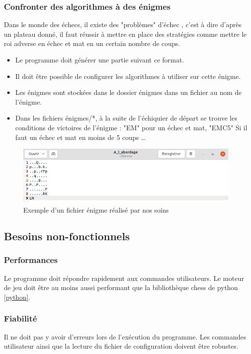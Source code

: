 \huge\documentclass{article}
\begin{document}
\subsubsection{Confronter des algorithmes à des énigmes}
Dans le monde des échecs, il existe des "problèmes" d'échec \cite{Krt}, c'est à dire d'après un plateau donné, il faut réussir à mettre en place des stratégies comme mettre le roi adverse en échec et mat en un certain nombre de coups.
\begin{itemize}
    \item Le programme doit générer une partie suivant ce format.
    \item Il doit être possible de configurer les algorithmes à utiliser sur cette énigme.
    \item Les énigmes sont stockées dans le dossier énigmes dans un fichier au nom de l'énigme.
    \item Dans les fichiers énigmes/*, à la suite de l'échiquier de départ se trouve les conditions de victoires de l'énigme : "EM" pour un échec et mat, "EMC5" Si il faut un échec et mat en moins de 5 coups \dots
\end{itemize}
\begin{figure}[!h]
        \centering
        \includegraphics[scale = 0.3]{img/a_l_abordage.png}
        \caption{Exemple d'un fichier énigme réalisé par nos soins}
        \label{fig:enigm}
    \end{figure}
\medskip
\subsection{Besoins non-fonctionnels}
\medskip
\subsubsection{Performances}
Le programme doit répondre rapidement aux commandes utilisateurs.
Le moteur de jeu doit être au moins aussi performant que la bibliothèque chess de python \ref{python}.
\medskip
\subsubsection{Fiabilité}
Il ne doit pas y avoir d'erreurs lors de l'exécution du programme. 
Les commandes utilisateur ainsi que la lecture du fichier de configuration doivent être robustes.
\medskip
\end{document}
